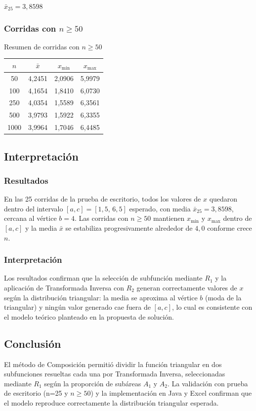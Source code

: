 $\bar{x}_{25} = 3{,}8598$

\subsubsection{\texorpdfstring{Corridas con $n \geq 50$}{Corridas con n mayor igual 50}}

\begin{mitabla}[H]{\texorpdfstring{Resumen de corridas con $n \geq 50$}{Resumen de corridas con n mayor igual 50}}
\begin{tabular}{cccc}
\toprule
$n$ & $\bar{x}$ & $x_{\min}$ & $x_{\max}$ \\
\midrule
50   & 4,2451 & 2,0906 & 5,9979 \\
100  & 4,1654 & 1,8410 & 6,0730 \\
250  & 4,0354 & 1,5589 & 6,3561 \\
500  & 3,9793 & 1,5922 & 6,3355 \\
1000 & 3,9964 & 1,7046 & 6,4485 \\
\bottomrule
\end{tabular}
\end{mitabla}

\subsection{Interpretación}

\subsubsection{Resultados}

En las 25 corridas de la prueba de escritorio, todos los valores de $x$ quedaron dentro del intervalo $[a,c]=[1{,}5,\,6{,}5]$ esperado, con media $\bar{x}_{25}=3{,}8598$, cercana al vértice $b=4$. Las corridas con $n \geq 50$ mantienen $x_{\min}$ y $x_{\max}$ dentro de $[a,c]$ y la media $\bar{x}$ se estabiliza progresivamente alrededor de $4{,}0$ conforme crece $n$.

\subsubsection{Interpretación}

Los resultados confirman que la selección de subfunción mediante $R_1$ y la aplicación de Transformada Inversa con $R_2$ generan correctamente valores de $x$ según la distribución triangular: la media se aproxima al vértice $b$ (moda de la triangular) y ningún valor generado cae fuera de $[a,c]$, lo cual es consistente con el modelo teórico planteado en la propuesta de solución.

\subsection{Conclusión}

El método de Composición permitió dividir la función triangular en dos subfunciones resueltas cada una por Transformada Inversa, seleccionadas mediante $R_1$ según la proporción de subáreas $A_1$ y $A_2$. La validación con prueba de escritorio (n=25 y $n \geq 50$) y la implementación en Java y Excel confirman que el modelo reproduce correctamente la distribución triangular esperada.
